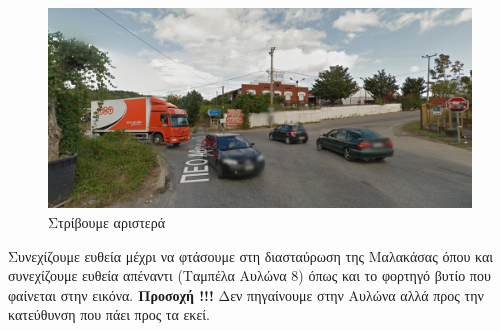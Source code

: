 \begin{figure}[hbp!]
	\centering
		\includegraphics[width=\textwidth]{images/athina-lamia/astefanos/astefanos3.PNG}
			\caption{Στρίβουμε αριστερά}
\end{figure}
Συνεχίζουμε ευθεία μέχρι να φτάσουμε στη διασταύρωση της Μαλακάσας όπου και συνεχίζουμε ευθεία απέναντι (Ταμπέλα Αυλώνα 8) όπως και το φορτηγό βυτίο που φαίνεται στην εικόνα. \textbf{Προσοχή !!!}
Δεν πηγαίνουμε στην Αυλώνα αλλά προς την κατεύθυνση που πάει προς τα εκεί.  

